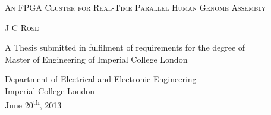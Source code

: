 \thispagestyle{empty}

\begin{center}
\null {}
\renewcommand{\baselinestretch}{2}
\doublespacing
\textsc{\huge{An FPGA Cluster for Real-Time  Parallel Human Genome Assembly}}



\textsc{\large{J C Rose}} \\

A Thesis submitted in fulfilment of requirements for the degree of \\
Master of Engineering of Imperial College London




Department of Electrical and Electronic Engineering\\
Imperial College London\\
June 20\textsuperscript{th}, 2013
\end{center}


